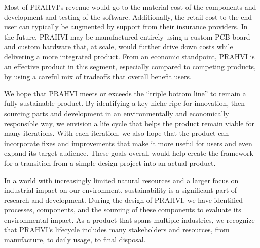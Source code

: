 	Most of PRAHVI's revenue would go to the material cost of the components and development and testing of the software. Additionally, the retail cost to the end user can typically be augmented by support from their insurance providers. In the future, PRAHVI may be manufactured entirely using a custom PCB board and custom hardware that, at scale, would further drive down costs while delivering a more integrated product. From an economic standpoint, PRAHVI is an effective product in this segment, especially compared to competing products, by using a careful mix of tradeoffs that overall benefit users.
	
	We hope that PRAHVI meets or exceeds the “triple bottom line” to remain a fully-sustainable product. By identifying a key niche ripe for innovation, then sourcing parts and development in an environmentally and economically responsible way, we envision a life cycle that helps the product remain viable for many iterations. With each iteration, we also hope that the product can incorporate fixes and improvements that make it more useful for users and even expand its target audience. These goals overall would help create the framework for a transition from a simple design project into an actual product.
	
	In a world with increasingly limited natural resources and a larger focus on industrial impact on our environment, sustainability is a significant part of research and development. During the design of PRAHVI, we have identified processes, components, and the sourcing of these components to evaluate its environmental impact. As a product that spans multiple industries, we recognize that PRAHVI's lifecycle includes many stakeholders and resources, from manufacture, to daily usage, to final disposal.
	
